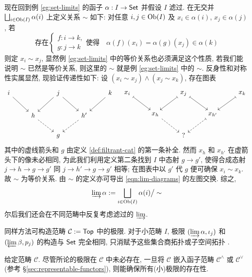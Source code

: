 现在回到例 \ref{eg:set-limits} 的函子 $\alpha: I \to \mathsf{Set}$ 并假设 $I$ 滤过. 在无交并 $\bigsqcup_{i \in \operatorname{Ob}(I)} \alpha(i)$ 上定义关系 $\sim$ 如下: 对任意 $i, j \in \operatorname{Ob}(I)$ 及 $x_i \in \alpha(i)$, $x_j \in \alpha(j)$, 若
\begin{equation}\label{eqn:filtrant-equiv} \text{存在} \begin{cases}
	f: i \to k, \\
	g: j \to k
	\end{cases}
	\text{使得} \quad \alpha(f)(x_i) = \alpha(g)(x_j) \in \alpha(k)
\end{equation}
则定 $x_i \sim x_j$, 显然例 \ref{eg:set-limits} 中的等价关系也必须满足这个性质, 若我们能说明 $\sim$ 已然是等价关系, 则这里的 $\sim$ 就是例 \ref{eg:set-limits} 中的 $\sim$. 反身性和对称性实属显然, 现验证传递性如下: 设 $(x_i \sim x_j) \wedge (x_j \sim x_k)$, 存在图表
\[ \begin{tikzcd}[scale=0.75]
	i \arrow[rd] & & j \arrow[ld] \arrow[rd] & & k \arrow[ld] \\
	& h \arrow[dashed, rd] & & h' \arrow[dashed, ld] & \\
	& & g & &
\end{tikzcd} \quad \begin{tikzcd}[scale=0.75]
	x_i \arrow[mapsto, rd] & & x_j \arrow[mapsto, ld] \arrow[mapsto, rd] & & x_k \arrow[mapsto, ld] \\
	& x_h \arrow[dashed, rd] & & x_{h'} \arrow[dashed, mapsto, ld] & \\
	& & ? & & 
\end{tikzcd} \]
其中的虚线箭头和 $g$ 由定义 \ref{def:filtrant-cat} 的第一条补全. 然而 $x_h$ 和 $x_{h'}$ 在虚箭头下的像未必相同, 为此我们利用定义第二条找到 $I$ 中态射 $g \to g'$, 使得合成态射 $j \to h \to g \to g'$ 同 $j \to h' \to g \to g'$ 相等; 在图表中以 $g'$ 代 $g$ 便可确保 $x_i \sim x_k$. 故 $\sim$ 为等价关系. 由 $\sim$ 的定义亦可导出 \eqref{eqn:lim-diagrams} 的左图交换. 综之,
\[ \varinjlim \alpha := \bigsqcup_{i \in \operatorname{Ob}(I)} \alpha(i) \big/ \sim \]
尔后我们还会在不同范畴中反复考虑滤过的 $\varinjlim$.

\begin{example}\label{eg:top-limits}
	同样方法可构造范畴 $\mathcal{C} := \mathsf{Top}$ 中的极限. 对于小范畴 $I$, 极限 $(\varinjlim \alpha, \iota_j)$ 和 $(\varprojlim \beta, p_j)$ 的构造与 $\mathsf{Set}$ 完全相同, 只消赋予这些集合商拓扑或子空间拓扑 \cite[\S 3.1, \S 3.4]{Xiong}.
\end{example}

给定范畴 $\mathcal{C}$. 尽管所论的极限在 $\mathcal{C}$ 中未必存在, 一旦将 $\mathcal{C}$ 嵌入函子范畴 $\mathcal{C}^\wedge$ 或 $\mathcal{C}^\vee$ (参考 \S\ref{sec:representable-functors}), 则能确保所有(小)极限的存在性.

